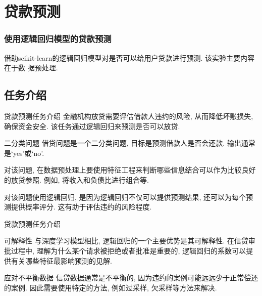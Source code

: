 \documentclass{beamer}
\begin{document}
\section{贷款预测}
\begin{frame}
	\frametitle{使用逻辑回归模型的贷款预测}

	借助scikit-learn的逻辑回归模型对是否可以给用户贷款进行预测. 该实验主要内容在于数
	据预处理.

\end{frame}

\subsection{任务介绍}
\begin{frame}[fragile]{贷款预测任务介绍}
	金融机构放贷需要评估借款人违约的风险, 从而降低坏账损失, 确保资金安全. 该任务通过逻辑回归来预测是否可以放贷.

	\begin{block}{二分类问题}
		借贷问题是一个二分类问题, 目标是预测借款人是否会还款. 输出通常是`yes'或`no'.
	\end{block}

	对该问题, 在数据预处理上要使用特征工程来判断哪些信息结合可以作为比较良好的放贷参照. 例如, 将收入和负债比进行组合等.

	对该问题使用逻辑回归, 是因为逻辑回归不仅可以提供预测结果, 还可以为每个预测提供概率评分. 这有助于评估违约的风险程度.
\end{frame}

\begin{frame}[fragile]{贷款预测任务介绍}
	\begin{block}{可解释性}
		与深度学习模型相比, 逻辑回归的一个主要优势是其可解释性. 在信贷审批过程中, 理解为什么某个请求被拒绝或者批准是重要的, 逻辑回归的系数可以提供有关哪些特征最影响预测的见解.
	\end{block}
	\begin{block}{应对不平衡数据}
		信贷数据通常是不平衡的, 因为违约的案例可能远远少于正常偿还的案例. 因此需要使用特定的方法, 例如过采样, 欠采样等方法来解决.
	\end{block}
\end{frame}
\end{document}
